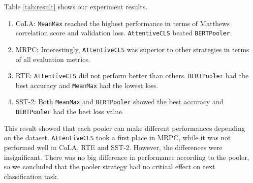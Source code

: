 \documentclass[UTF8]{article}
\begin{document}
Table \ref{tab:result} shows our experiment results. 
\begin{enumerate}
    \item CoLA: \texttt{MeanMax} reached the highest performance in terms of Matthews correlation score and validation loss. \texttt{AttentiveCLS} beated \texttt{BERTPooler}.
    \item MRPC: Interestingly, \texttt{AttentiveCLS} was superior to other strategies in terms of all evaluation metrics.
    \item RTE: \texttt{AttentiveCLS} did not perform better than others. \texttt{BERTPooler} had the best accuracy and \texttt{MeanMax} had the lowest loss. 
    \item SST-2: Both \texttt{MeanMax} and \texttt{BERTPooler} showed the best accuracy and \texttt{BERTPooler} had the best loss value.
\end{enumerate}

This result showed that each pooler can make different performances depending on the dataset. 
\texttt{AttentiveCLS} took a first place in MRPC, while it was not performed well in CoLA, RTE and SST-2. However, the differences were insignificant. There was no big difference in performance according to the pooler, so we concluded that the pooler strategy had no critical effect on text classification task.




\end{document}
